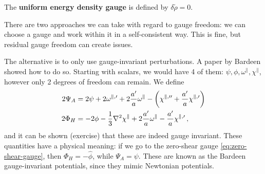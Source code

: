 \documentclass[main.tex]{subfiles}
\begin{document}
The \textbf{uniform energy density gauge} is defined by \(\delta \widetilde{\rho} = 0\). 

There are two approaches we can take with regard to gauge freedom: we can choose a gauge and work within it in a self-consistent way. 
This is fine, but residual gauge freedom can create issues. 

The alternative is to only use gauge-invariant perturbations. 
A paper by Bardeen \cite[]{bardeenGaugeinvariantCosmologicalPerturbations1980a} showed how to do so.
Starting with scalars, we would have 4 of them: \(\psi, \phi , \omega^{\parallel}, \chi^{\parallel}\), however only 2 degrees of freedom can remain.
We define 
%
\begin{align}
2 \Psi  _A &= 2 \psi + 2 \omega^{\parallel, \prime} + 2 \frac{a'}{a} \omega^{\parallel} - \qty(\chi^{\parallel, \prime \prime} + \frac{a'}{a} \chi^{\parallel, \prime})  \\
2 \Phi_H &= -2 \phi - \frac{1}{3} \nabla^2 \chi^{\parallel} + 2 \frac{a'}{a} \omega^{\parallel} - \frac{a'}{a} \chi^{\parallel, \prime}
\,,
\end{align}
%
and it can be shown (exercise) that these are indeed gauge invariant. 
These quantities have a physical meaning: if we go to the zero-shear gauge \eqref{eq:zero-shear-gauge}, then \(\Phi _H =- \hat{\phi} \), while \(\Psi _A = \psi \).
These are known as the Bardeen gauge-invariant potentials, since they mimic Newtonian potentials. 
\end{document}
